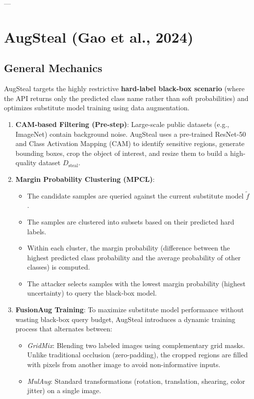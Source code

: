 \documentclass{article}
\begin{document}
---


\section{AugSteal (Gao et al., 2024)}

\subsection{General Mechanics}
AugSteal targets the highly restrictive \textbf{hard-label black-box scenario} (where the API returns only the predicted class name rather than soft probabilities) and optimizes substitute model training using data augmentation.
\begin{enumerate}
    \item \textbf{CAM-based Filtering (Pre-step)}: Large-scale public datasets (e.g., ImageNet) contain background noise. AugSteal uses a pre-trained ResNet-50 and Class Activation Mapping (CAM) to identify sensitive regions, generate bounding boxes, crop the object of interest, and resize them to build a high-quality dataset $D_{\text{steal}}$.
    \item \textbf{Margin Probability Clustering (MPCL)}:
    \begin{itemize}
        \item The candidate samples are queried against the current substitute model $\tilde{f}$.
        \item The samples are clustered into subsets based on their predicted hard labels.
        \item Within each cluster, the margin probability (difference between the highest predicted class probability and the average probability of other classes) is computed.
        \item The attacker selects samples with the lowest margin probability (highest uncertainty) to query the black-box model.
    \end{itemize}
    \item \textbf{FusionAug Training}: To maximize substitute model performance without wasting black-box query budget, AugSteal introduces a dynamic training process that alternates between:
    \begin{itemize}
        \item \textit{GridMix}: Blending two labeled images using complementary grid masks. Unlike traditional occlusion (zero-padding), the cropped regions are filled with pixels from another image to avoid non-informative inputs.
        \item \textit{MulAug}: Standard transformations (rotation, translation, shearing, color jitter) on a single image.
    \end{itemize}
\end{enumerate}
\end{document}
